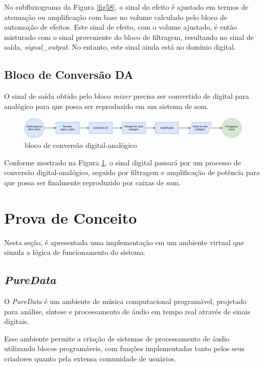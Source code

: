 No subfluxograma da Figura \ref{fig58}, o sinal do efeito é ajustado em termos de atenuação ou amplificação com base no volume calculado pelo bloco de automação de efeitos. Este sinal de efeito, com o volume ajustado, é então misturado com o sinal proveniente do bloco de filtragem, resultando no sinal de saída, \textit{signal\_output}. No entanto, este sinal ainda está no domínio digital.

\subsection{Bloco de Conversão DA}

O sinal de saída obtido pelo bloco \textit{mixer} precisa ser convertido de digital para analógico para que possa ser reproduzido em um sistema de som.

\begin{figure}[h]
    \centering
    \includegraphics[width=\textwidth]{figuras/fig59.png}
    \caption{bloco de conversão digital-analógico}
    \label{fig59}
\end{figure}

Conforme mostrado na Figura \ref{fig59}, o sinal digital passará por um processo de conversão digital-analógico, seguido por filtragem e amplificação de potência para que possa ser finalmente reproduzido por caixas de som.

\newpage
\section{Prova de Conceito}

Nesta seção, é apresentada uma implementação em um ambiente virtual que simula a lógica de funcionamento do sistema.

\subsection{\textit{PureData}}

O \textit{PureData} \cite{puredata} é um ambiente de música computacional programável, projetado para análise, síntese e processamento de áudio em tempo real através de sinais digitais.

Esse ambiente permite a criação de sistemas de processamento de áudio utilizando blocos programáveis, com funções implementadas tanto pelos seus criadores quanto pela extensa comunidade de usuários.

